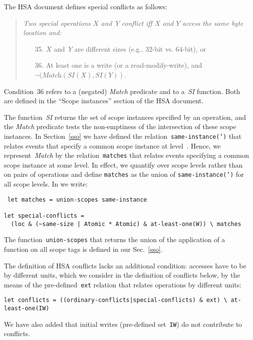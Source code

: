 \documentclass[a4paper]{article}
\begin{document}
\label{specialconflict}The HSA document defines special conflicts as follows:
\begin{quote}\em
Two special operations $X$ and~$Y$ conflict iff $X$ and $Y$ access
the same byte location and:
\begin{itemize}
\item[35.] $X$ and~$Y$ are different sizes (e.g., 32-bit vs. 64-bit), or
\item[36.] At least one is a write (or a read-modify-write),
and $\neg(\textit{Match}(\textit{SI}(X), \textit{SI}(Y))$.
\end{itemize}
\end{quote}
Condition~36 refers to a (negated) \textit{Match} predicate and to
a~\textit{SI} function.  Both are defined in the ``Scope instances'' section of
the HSA document.

The function~\textit{SI} returns the set of scope instances specified by an
operation, and the \textit{Match} predicate tests the non-emptiness of the
intersection of these scope instances. In Section~\ref{sso} we have defined the
relation~\texttt{same-instance(')} that relates events that specify
a common scope instance at level~. Hence, we
represent~\textit{Match} by the relation~\verb+matches+ that relates events
specifying a common scope instance at some level.  In effect, we quantify over
scope levels rather than on pairs of operations and  define \verb+matches+ as
the union of \texttt{same-instance(')} for all scope levels. In
\cat{} we write: \begin{verbatim} let matches = union-scopes same-instance

let special-conflicts =
  (loc & (~same-size | Atomic * Atomic) & at-least-one(W)) \ matches
\end{verbatim}
The function~\verb+union-scopes+ that returns the union of
the application of a function on all scope tags is defined
in our Sec.~\ref{sso}. 

The definition of HSA conflicts lacks an additional condition:
accesses have to be by different units, which we consider in
the definition of conflicts below, by the means of the pre-defined~\verb+ext+
relation that relates operations by different units:
\begin{verbatim}
let conflicts = ((ordinary-conflicts|special-conflicts) & ext) \ at-least-one(IW)
\end{verbatim}
We have also added that initial writes (pre-defined set~\verb+IW+)
do not contribute to conflicts.
\end{document}
